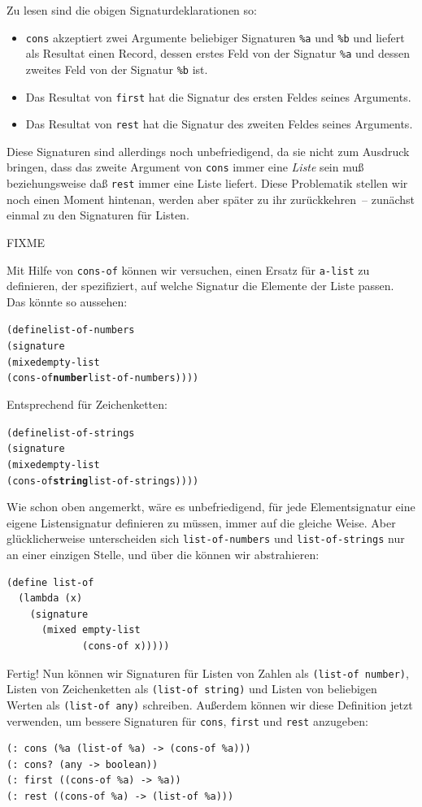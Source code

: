Zu lesen sind die obigen Signaturdeklarationen so:
%
\begin{itemize}
\item \texttt{cons} akzeptiert zwei Argumente beliebiger Signaturen
  \verb|%a| und \verb|%b| und
  liefert als Resultat einen Record, dessen erstes Feld von der Signatur
  \verb|%a| und dessen zweites Feld von der Signatur \verb|%b| ist.
\item Das Resultat von \texttt{first} hat die
  Signatur des ersten Feldes seines Arguments.
\item Das Resultat von \texttt{rest} hat die
  Signatur des zweiten Feldes seines Arguments.
\end{itemize}
%

Diese Signaturen sind allerdings noch unbefriedigend, da sie nicht zum
Ausdruck bringen, dass das zweite Argument von \texttt{cons} immer
eine \emph{Liste} sein muß beziehungsweise daß \texttt{rest} immer
eine Liste liefert.  Diese Problematik stellen wir noch einen Moment
hintenan, werden aber später zu ihr zurückkehren~-- zunächst einmal zu
den Signaturen für Listen.

FIXME

Mit Hilfe von \texttt{cons-of} können wir versuchen, einen Ersatz für
\texttt{a-list} zu definieren, der spezifiziert, auf welche Signatur
die Elemente der Liste passen.  Das könnte so aussehen:
%
\begin{alltt}
(define list-of-numbers
  (signature
    (mixed empty-list
           (cons-of \textbf{number} list-of-numbers))))
\end{alltt}
%
Entsprechend für Zeichenketten:
%
\begin{alltt}
(define list-of-strings
  (signature
    (mixed empty-list
           (cons-of \textbf{string} list-of-strings))))
\end{alltt}
%
Wie schon oben angemerkt, wäre es unbefriedigend, für jede Elementsignatur eine
eigene Listensignatur definieren zu müssen, immer auf die gleiche
Weise.  Aber glücklicherweise unterscheiden sich
\texttt{list-of-numbers} und \texttt{list-of-strings} nur an einer
einzigen Stelle, und über die können wir abstrahieren:
%
\begin{verbatim}
(define list-of
  (lambda (x)
    (signature
      (mixed empty-list
             (cons-of x)))))
\end{verbatim}
%
Fertig!  Nun können wir Signaturen für Listen von Zahlen als
\texttt{(list-of number)}, Listen von Zeichenketten als
\texttt{(list-of string)} und Listen von beliebigen Werten als
\texttt{(list-of any)} schreiben.  Außerdem können wir diese
Definition jetzt verwenden, um bessere Signaturen für
\texttt{cons}, \texttt{first} und \texttt{rest} anzugeben:
%
\begin{verbatim}
(: cons (%a (list-of %a) -> (cons-of %a)))
(: cons? (any -> boolean))
(: first ((cons-of %a) -> %a))
(: rest ((cons-of %a) -> (list-of %a)))
\end{verbatim}
%


